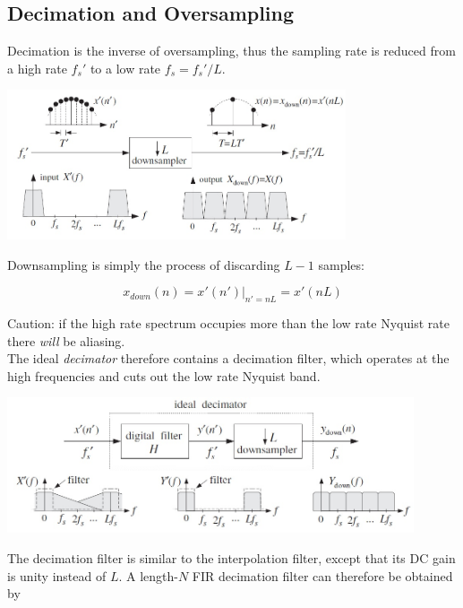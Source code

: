 \subsection{Decimation and Oversampling}
Decimation is the inverse of oversampling, thus the sampling rate is reduced
from a high rate $f_s'$ to a low rate $f_s = f_s' / L$.

\begin{center}
	\includegraphics[width=10cm]{images/IntDecOv_Downsampler.jpg}
\end{center}

Downsampling is simply the process of discarding $L-1$ samples:

\begin{equation*}
	x_{down}(n) = \left.x'(n')\right|_{n'=nL} = x'(nL)
\end{equation*}

Caution: if the high rate spectrum occupies more than the low rate Nyquist rate
there \emph{will} be aliasing. \\

The ideal \emph{decimator} therefore contains a decimation filter, which
operates at the high frequencies and cuts out the low rate Nyquist band.

\begin{center}
	\includegraphics[width=12cm]{images/IntDecOv_Decimator.jpg}
\end{center}

The decimation filter is similar to the interpolation filter, except that
its DC gain is unity instead of $L$. A length-$N$ FIR decimation filter
can therefore be obtained by

